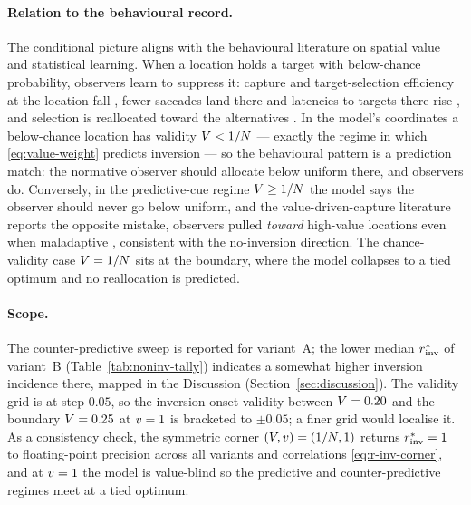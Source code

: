 \paragraph{Relation to the behavioural record.}
The conditional picture aligns with the behavioural literature on
spatial value and statistical learning. When a location holds a target
with below-chance probability, observers learn to suppress it: capture
and target-selection efficiency at the location fall
\cite{wang_theeuwes2018_statistical_learning_distractor_suppression},
fewer saccades land there and latencies to targets there rise
\cite{wang_samara_theeuwes2019}, and selection is reallocated toward the
alternatives \cite{kong_li_wang_theeuwes2020}. In the model's
coordinates a below-chance location has validity $V < 1/N$ ---
exactly the regime in which \eqref{eq:value-weight} predicts inversion
--- so the behavioural pattern is a prediction match: the normative
observer should allocate below uniform there, and observers do.
Conversely, in the predictive-cue regime $V \ge 1/N$ the model
says the observer should never go below uniform, and the
value-driven-capture literature reports the opposite mistake, observers
pulled \emph{toward} high-value locations even when maladaptive
\cite{failing_theeuwes2018_selection_history,
hickey2010_reward_salience_acc}, consistent with the no-inversion
direction. The chance-validity case $V = 1/N$
\cite{posner1980_orienting} sits at the boundary, where the model
collapses to a tied optimum and no reallocation is predicted.

\paragraph{Scope.}
The counter-predictive sweep is reported for variant~A; the lower median
$r^{*}_{\mathrm{inv}}$ of variant~B (Table~\ref{tab:noninv-tally}) indicates a
somewhat higher inversion incidence there, mapped in the Discussion
(Section~\ref{sec:discussion}). The validity grid is at step $0.05$, so
the inversion-onset validity between $V = 0.20$ and the boundary
$V = 0.25$ at $v = 1$ is bracketed to $\pm 0.05$; a finer grid
would localise it. As a consistency check, the symmetric corner
$(V, v) = (1/N, 1)$ returns $r^{*}_{\mathrm{inv}} = 1$ to
floating-point precision across all variants and correlations
\eqref{eq:r-inv-corner}, and at $v = 1$ the model is value-blind so
the predictive and counter-predictive regimes meet at a tied optimum.
